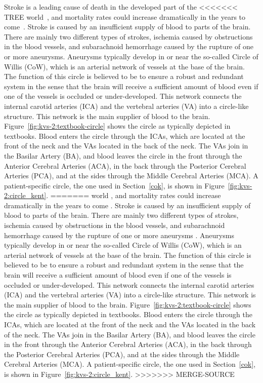 Stroke is a leading cause of death in the developed part of the
<<<<<<< TREE
world~\citep{Feigin2005}, and mortality rates could increase
dramatically in the years to come~\citep{MurrayLopez1997}. Stroke is
caused by an insufficient supply of blood to parts of the brain. There
are mainly two different types of strokes, ischemia caused by
obstructions in the blood vessels, and subarachnoid hemorrhage caused
by the rupture of one or more aneurysms. Aneurysms
typically develop in or near the so-called Circle of Willis (CoW),
which is an arterial network of vessels at the base of the brain. The
function of this circle is believed to be to ensure a robust and
redundant system in the sense that the brain will receive a sufficient
amount of blood even if one of the vessels is occluded or
under-developed. This network connects the internal carotid arteries
(ICA) and the vertebral arteries (VA) into a circle-like
structure. This network is the main supplier of blood to the
brain. Figure~\ref{fig:kvs-2:textbook-circle} shows the circle as
typically depicted in textbooks. Blood enters the circle through the
ICAs, which are located at the front of the neck and the VAs located
in the back of the neck.  The VAs join in the Basilar Artery (BA), and
blood leaves the circle in the front through the Anterior Cerebral
Arteries (ACA), in the back through the Posterior Cerebral Arteries
(PCA), and at the sides through the Middle Cerebral Arteries (MCA). A
patient-specific circle, the one used in Section~\ref{cok}, is shown
in Figure~\ref{fig:kvs-2:circle_kent}.
=======
world \citep{Feigin2005}, and mortality rates could increase dramatically
in the years to come \citep{MurrayLopez1997}. Stroke is caused by an
insufficient supply of blood to parts of the brain. There are mainly
two different types of strokes, ischemia caused by obstructions in
the blood vessels, and subarachnoid hemorrhage caused by the rupture
of one or more aneurysms \citep{Humphrey2001}. Aneurysms typically
develop in or near the so-called Circle of Willis (CoW), which is an
arterial network of vessels at the base of the brain. The function of
this circle is believed to be to ensure a robust and redundant system
in the sense that the brain will receive a sufficient amount of blood
even if one of the vessels is occluded or under-developed. This network
connects the internal carotid arteries (ICA) and the vertebral arteries
(VA) into a circle-like structure. This network is the main supplier
of blood to the brain. Figure~\ref{fig:kvs-2:textbook-circle} shows
the circle as typically depicted in textbooks. Blood enters the circle
through the ICAs, which are located at the front of the neck and the VAs
located in the back of the neck.  The VAs join in the Basilar Artery
(BA), and blood leaves the circle in the front through the Anterior
Cerebral Arteries (ACA), in the back through the Posterior Cerebral
Arteries (PCA), and at the sides through the Middle Cerebral Arteries
(MCA). A patient-specific circle, the one used in Section~\ref{cok},
is shown in Figure~\ref{fig:kvs-2:circle_kent}.
>>>>>>> MERGE-SOURCE

